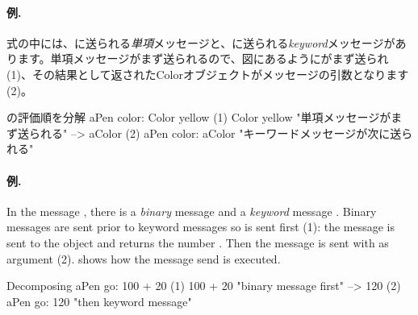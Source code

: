\documentclass[a4paper,10pt,twoside]{book}
\begin{document}
\paragraph{例.}
式の中には、に送られる\emph{単項}メッセージと、に送られる\emph{keyword}メッセージがあります。単項メッセージがまず送られるので、図にあるようにがまず送られ(1)、その結果として返されたColorオブジェクトがメッセージの引数となります(2)。

\begin{example}[decColor]{の評価順を分解}{}
        aPen color: Color yellow
(1)                       Color yellow        "単項メッセージがまず送られる"
                        --> aColor
(2)   aPen color: aColor                 "キーワードメッセージが次に送られる"
\end{example}

\paragraph{例.} In the message , there is a \emph{binary} message  and a \emph{keyword} message . Binary messages are sent prior to keyword messages so  is sent first (1): the message  is sent to the object  and returns the number . Then the message  is sent with  as argument (2).
 shows how the message send is executed. 

\begin{example}[decGo]{Decomposing }{}
      aPen go: 100 + 20   
(1)                 100 + 20           "binary message first"
                   -->   120
(2)  aPen go: 120                   "then keyword message"
\end{example}
\end{document}
